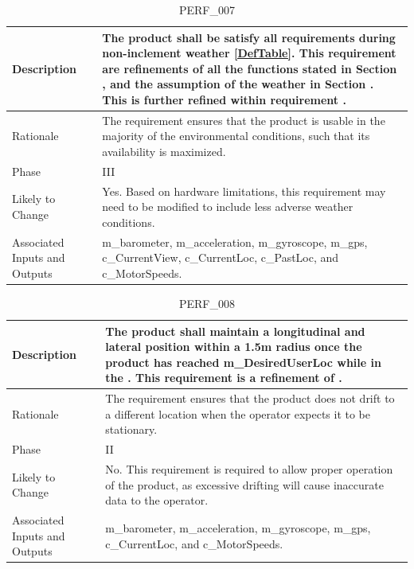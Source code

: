 \documentclass{article}
\begin{document}
\begin{table}[!h]
\begin{center}
\caption {PERF\_007} 
\label{PERF_007}
\begin{tabular}{ | m{3cm} | m{11cm} | }
\hline
Description & The product shall be satisfy all requirements during non-inclement weather \ref{DefTable}.  This requirement are refinements of all the functions stated in Section \nameref{subsec:ProdFunc}, and the assumption of the weather in Section \nameref{sec:Assumptions}. This is further refined within requirement \nameref{MTNC_003}. \\
\hline
Rationale & The requirement ensures that the product is usable in the majority of the environmental conditions, such that its availability is maximized. \\
\hline
Phase & III \\
\hline
Likely to Change &  Yes. Based on hardware limitations, this requirement may need to be modified to include less adverse weather conditions.  \\
\hline
Associated Inputs and Outputs & m\_barometer, m\_acceleration, m\_gyroscope, m\_gps, c\_CurrentView, c\_CurrentLoc, c\_PastLoc, and c\_MotorSpeeds.  \\
\hline
\end{tabular}
\end{center}
\end{table}

\begin{table}[!h]
\begin{center}
\caption {PERF\_008} 
\label{PERF_008}
\begin{tabular}{ | m{3cm} | m{11cm} | }
\hline
Description & The product shall maintain a longitudinal and lateral position within a 1.5m radius once the product has reached m\_DesiredUserLoc while in the \nameref{Compulsive Move State}. This requirement is a refinement of \nameref{STA_011}. \\
\hline
Rationale & The requirement ensures that the product does not drift to a different location when the operator expects it to be stationary. \\
\hline
Phase & II \\
\hline
Likely to Change & No. This requirement is required to allow proper operation of the product, as excessive drifting will cause inaccurate data to the operator. \\
\hline
Associated Inputs and Outputs & m\_barometer, m\_acceleration, m\_gyroscope, m\_gps, c\_CurrentLoc, and c\_MotorSpeeds.  \\
\hline
\end{tabular}
\end{center}
\end{table}
\end{document}
